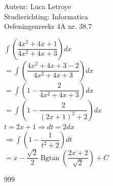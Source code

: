 \documentclass[a4paper]{article}
\newcommand{\bgtan}{\operatorname{Bgtan}}
\begin{document}
  
\noindent \large Auteur: Luca Letroye \\
\noindent \large Studierichting: Informatica\\
\noindent \large Oefeningenreeks 4A nr. 38.7

\medskip
\normalsize


$\displaystyle\int \left(\dfrac{4x^2+4x+1}{4x^2+4x+3}\right)dx $\\

$ = \displaystyle\int \left(\dfrac{4x^2+4x+3-2}{4x^2+4x+3}\right)dx $\\

$ = \displaystyle\int \left(1- \dfrac{2}{4x^2+4x+3}\right)dx $\\

$ = \displaystyle\int \left(1- \dfrac{2}{(2x+1)^2+2}\right)dx $\\

$t = 2x+1 \Rightarrow dt = 2dx$\\

$ \Rightarrow \displaystyle\int \left(1- \dfrac{1}{t^2+2}\right)dt $\\

$ = x - \dfrac{\sqrt{2}}{2}\bgtan \left(\dfrac{2x+2}{\sqrt{2}}\right) +C$\\




\begin{thebibliography}{999}
\end{thebibliography}
\end{document}
